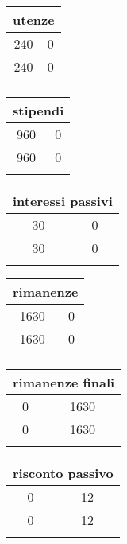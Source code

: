 \documentclass[twocolumn]{article}
\begin{document}
\begin{table}[ht]\centering 
\begin{tabular}{|c|c|}
\hline
\multicolumn{2}{|c|}{utenze} \\ 
\hline  \hline 
240 & 0 \\ 
\hline
240 & 0 \\ 
 \\ 
\hline
\end{tabular} \end{table} 
\begin{table}[ht]\centering 
\begin{tabular}{|c|c|}
\hline
\multicolumn{2}{|c|}{stipendi} \\ 
\hline  \hline 
960 & 0 \\ 
\hline
960 & 0 \\ 
 \\ 
\hline
\end{tabular} \end{table} 
\begin{table}[ht]\centering 
\begin{tabular}{|c|c|}
\hline
\multicolumn{2}{|c|}{interessi passivi} \\ 
\hline  \hline 
30 & 0 \\ 
\hline
30 & 0 \\ 
 \\ 
\hline
\end{tabular} \end{table} 
\begin{table}[ht]\centering 
\begin{tabular}{|c|c|}
\hline
\multicolumn{2}{|c|}{rimanenze} \\ 
\hline  \hline 
1630 & 0 \\ 
\hline
1630 & 0 \\ 
 \\ 
\hline
\end{tabular} \end{table} 
\begin{table}[ht]\centering 
\begin{tabular}{|c|c|}
\hline
\multicolumn{2}{|c|}{rimanenze finali} \\ 
\hline  \hline 
0 & 1630 \\ 
\hline
0 & 1630 \\ 
 \\ 
\hline
\end{tabular} \end{table} 
\begin{table}[ht]\centering 
\begin{tabular}{|c|c|}
\hline
\multicolumn{2}{|c|}{risconto passivo} \\ 
\hline  \hline 
0 & 12 \\ 
\hline
0 & 12 \\ 
 \\ 
\hline
\end{tabular} \end{table} 
\end{document}
